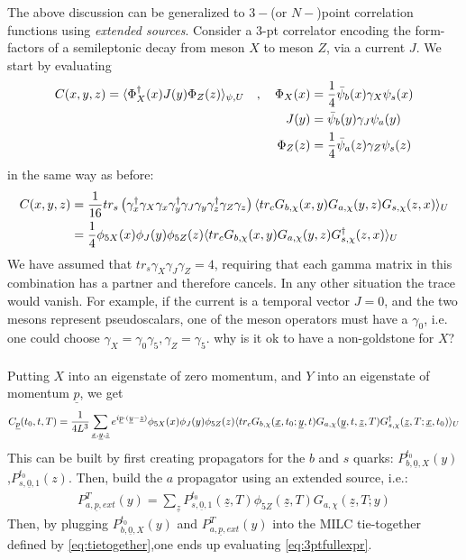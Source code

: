 \documentclass[a4paper,10pt]{article}
\numberwithin{equation}{section}
\begin{document}
The above discussion can be generalized to $3-$(or $N-$)point correlation functions using {\it{extended sources}}. Consider a 3-pt correlator encoding the form-factors of a semileptonic decay from meson $X$ to meson $Z$, via a current $J$. We start by evaluating
\begin{align}
	C(x,y,z) = \langle \Phi^{\dagger}_X(x) J(y) \Phi_Z(z) \rangle_{\psi,U} \quad , \quad \Phi_X(x) &= {1\over 4} \bar{\psi}_b(x) \gamma_X \psi_s(x) \\
	\nonumber
	J(y) &= \bar{\psi}_b(y)\gamma_J\psi_a(y) \\
	\nonumber
	\Phi_Z(z) &= {1\over 4}\bar{\psi}_a(z)\gamma_Z \psi_s(z)
\end{align}
in the same way as before:
\begin{align}
	C(x,y,z) &= {1\over 16} tr_s\left( \gamma^{\dagger}_x \gamma_X \gamma_x \gamma^{\dagger}_y \gamma_J \gamma_y \gamma^{\dagger}_z \gamma_Z \gamma_z \right) \langle tr_c G_{b,\chi}(x,y) G_{a,\chi}(y,z) G_{s,\chi}(z,x)\rangle_U \\
	&= {1\over 4} \phi_{5X}(x) \phi_J(y) \phi_{5Z}(z) \langle tr_c G_{b,\chi}(x,y) G_{a,\chi}(y,z) G^{\dagger}_{s,\chi}(z,x) \rangle_U
\end{align}
We have assumed that $tr_s \gamma_X\gamma_J\gamma_Z = 4$, requiring that each gamma matrix in this combination has a partner and therefore cancels. In any other situation the trace would vanish. For example, if the current is a temporal vector $J=0$, and the two mesons represent pseudoscalars, one of the meson operators must have a $\gamma_0$, i.e. one could choose $\gamma_X=\gamma_0\gamma_5, \gamma_Z=\gamma_5$. {\color{red}why is it ok to have a non-goldstone for $X$?}
\\ \\
Putting $X$ into an eigenstate of zero momentum, and $Y$ into an eigenstate of momentum $\underline{p}$, we get
\begin{align}
	C_{\underline{p}}(t_0,t,T) = {1\over 4 L^3} \sum_{\underline{x},\underline{y},\underline{z}} e^{i\underline{p}\cdot(\underline{y}-\underline{z})} \phi_{5X}(x) \phi_J(y) \phi_{5Z}(z) \langle tr_c G_{b,\chi}(\underline{x},t_0;\underline{y},t) G_{a,\chi}(\underline{y},t,\underline{z},T) G^{\dagger}_{s,\chi}(\underline{z},T;\underline{x},t_0) \rangle_U
	\label{eq:3ptfullexpr}
\end{align}
This can be built by first creating propagators for the $b$ and $s$ quarks: $P^{t_0}_{b,\underline{0},X}(y)$,$P^{t_0}_{s,\underline{0},1}(z)$. Then, build the $a$ propagator using an extended source, i.e.:
\begin{align}
	P^T_{a,\underline{p},ext}(y) = \sum_{\underline{z}} P^{t_0}_{s,\underline{0},1}(\underline{z},T) \phi_{5Z}(\underline{z},T) G_{a,\chi}(\underline{z},T;y)
\end{align}
Then, by plugging $P^{t_0}_{b,\underline{0},X}(y)$ and $P^T_{a,\underline{p},ext}(y)$ into the MILC tie-together defined by \eqref{eq:tietogether},one ends up evaluating \eqref{eq:3ptfullexpr}.
\end{document}
